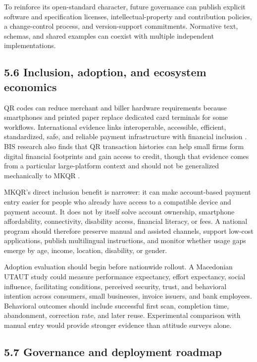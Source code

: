 To reinforce its open-standard character, future governance can publish explicit software and specification licenses, intellectual-property and contribution policies, a change-control process, and version-support commitments. Normative text, schemas, and shared examples can coexist with multiple independent implementations.

\subsection{5.6 Inclusion, adoption, and ecosystem economics}

QR codes can reduce merchant and biller hardware requirements because smartphones and printed paper replace dedicated card terminals for some workflows. International evidence links interoperable, accessible, efficient, standardized, safe, and reliable payment infrastructure with financial inclusion \cite{pafi}. BIS research also finds that QR transaction histories can help small firms form digital financial footprints and gain access to credit, though that evidence comes from a particular large-platform context and should not be generalized mechanically to MKQR \cite{beck2022}.

MKQR's direct inclusion benefit is narrower: it can make account-based payment entry easier for people who already have access to a compatible device and payment account. It does not by itself solve account ownership, smartphone affordability, connectivity, disability access, financial literacy, or fees. A national program should therefore preserve manual and assisted channels, support low-cost applications, publish multilingual instructions, and monitor whether usage gaps emerge by age, income, location, disability, or gender.

Adoption evaluation should begin before nationwide rollout. A Macedonian UTAUT study could measure performance expectancy, effort expectancy, social influence, facilitating conditions, perceived security, trust, and behavioral intention across consumers, small businesses, invoice issuers, and bank employees. Behavioral outcomes should include successful first scan, completion time, abandonment, correction rate, and later reuse. Experimental comparison with manual entry would provide stronger evidence than attitude surveys alone.

\subsection{5.7 Governance and deployment roadmap}

